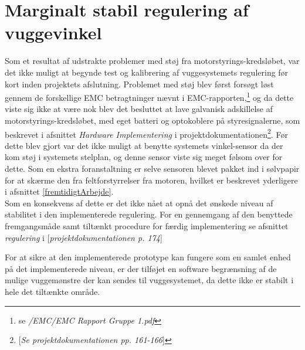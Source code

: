 \section{Marginalt stabil regulering af vuggevinkel}
Som et resultat af udstrakte problemer med støj fra motorstyrings-kredsløbet, var det ikke muligt at begynde test og kalibrering af vuggesystemets regulering før kort inden projektets afslutning. Problemet med støj blev først forsøgt løst gennem de forskellige EMC betragtninger nævnt i EMC-rapporten,\footnote{se \citep{cd} \textit{/EMC/EMC Rapport Gruppe 1.pdf}} og da dette viste sig ikke at være nok blev det besluttet at lave galvanisk adskillelse af motorstyrings-kredsløbet, med eget batteri og optokoblere på styresignalerne, som beskrevet i afsnittet \textit{Hardware Implementering} i projektdokumentationen\footnote{[\textit{Se projektdokumentationen pp. 161-166}]}. Før dette blev gjort var det ikke muligt at benytte systemets vinkel-sensor da der kom støj i systemets stelplan, og denne sensor viste sig meget følsom over for dette. Som en ekstra foranstaltning er selve sensoren blevet pakket ind i sølvpapir for at skærme den fra feltforstyrrelser fra motoren, hvilket er beskrevet yderligere i afsnittet \vref{fremtidigtArbejde}.\\
Som en konsekvens af dette er det ikke nået at opnå det ønskede niveau af stabilitet i den implementerede regulering. For en gennemgang af den benyttede fremgangsmåde samt tiltænkt procedure for færdig implementering se afsnittet \textit{regulering} i [\textit{projektdokumentationen p. 174}]

For at sikre at den implementerede prototype kan fungere som en samlet enhed på det implementerede niveau, er der tilføjet en software begrænsning af de mulige vuggemønstre der kan sendes til vuggesystemet, da dette ikke er stabilt i hele det tiltænkte område.